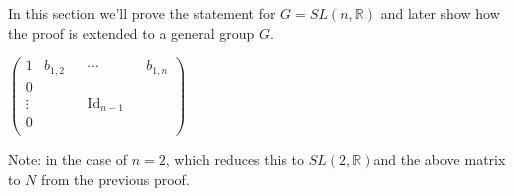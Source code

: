 \documentclass[
]{article}
\newcommand{\G}{\ensuremath{G}}
\newcommand{\sltr}{\ensuremath{SL(2, \mathbb{R})}}
\newcommand{\slnr}{\ensuremath{SL(n, \mathbb{R})}}
\begin{document}
In this section we'll prove the statement for $G = \slnr$ and later show how the proof is extended to a general group \G.


\begin{math}
  \begin{pmatrix}
    1 & b_{1,2} & & \cdots & & b_{1,n} \\
    0 & & &  & \\
    \vdots & & & \text{Id}_{n-1} & \\
    0 & & & & \\
  \end{pmatrix}
\end{math}

Note: in the case of $n = 2$, which reduces this to \sltr and the above matrix to $N$ from the previous proof.
\end{document}
